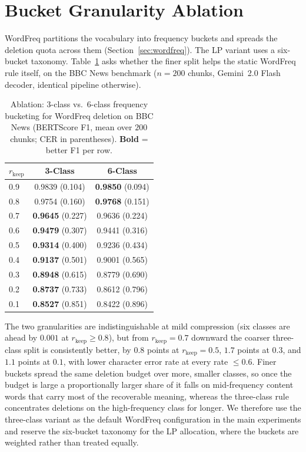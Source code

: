 \documentclass[11pt]{article}
\newcommand{\rkeep}{r_{\mathrm{keep}}}
\begin{document}
\section{Bucket Granularity Ablation}
\label{app:ablations}

WordFreq partitions the vocabulary into frequency buckets and spreads the deletion quota across them
(Section~\ref{sec:wordfreq}). The LP variant uses a six-bucket taxonomy. Table~\ref{tab:bucket_ablation}
asks whether the finer split helps the static WordFreq rule itself, on the BBC News benchmark
($n{=}200$ chunks, Gemini~2.0 Flash decoder, identical pipeline otherwise).

\begin{table}[htbp]
\centering
\small
\setlength{\tabcolsep}{5pt}
\caption{Ablation: 3-class vs.\ 6-class frequency bucketing for WordFreq deletion on BBC News
(BERTScore F1, mean over $200$ chunks; CER in parentheses). \textbf{Bold} = better F1 per row.}
\label{tab:bucket_ablation}
\begin{tabular}{lcc}
\toprule
$\rkeep$ & 3-Class & 6-Class \\
\midrule
0.9 & 0.9839 (0.104) & \textbf{0.9850} (0.094) \\
0.8 & 0.9754 (0.160) & \textbf{0.9768} (0.151) \\
0.7 & \textbf{0.9645} (0.227) & 0.9636 (0.224) \\
0.6 & \textbf{0.9479} (0.307) & 0.9441 (0.316) \\
0.5 & \textbf{0.9314} (0.400) & 0.9236 (0.434) \\
0.4 & \textbf{0.9137} (0.501) & 0.9001 (0.565) \\
0.3 & \textbf{0.8948} (0.615) & 0.8779 (0.690) \\
0.2 & \textbf{0.8737} (0.733) & 0.8612 (0.796) \\
0.1 & \textbf{0.8527} (0.851) & 0.8422 (0.896) \\
\bottomrule
\end{tabular}
\end{table}

The two granularities are indistinguishable at mild compression (six classes are ahead by
$0.001$ at $\rkeep\ge0.8$), but from $\rkeep=0.7$ downward the coarser three-class split is
consistently better, by $0.8$ points at $\rkeep=0.5$, $1.7$ points at $0.3$, and $1.1$ points at
$0.1$, with lower character error rate at every rate $\le0.6$. Finer buckets spread the same deletion
budget over more, smaller classes, so once the budget is large a proportionally larger share of it
falls on mid-frequency content words that carry most of the recoverable meaning, whereas the
three-class rule concentrates deletions on the high-frequency class for longer. We therefore use the
three-class variant as the default WordFreq configuration in the main experiments and reserve the
six-bucket taxonomy for the LP allocation, where the buckets are weighted rather than treated equally.
\end{document}
